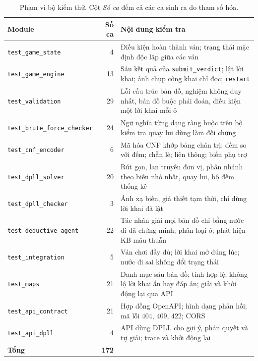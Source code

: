 \begin{table}[htbp]
  \centering\small
  \caption{Phạm vi bộ kiểm thử. Cột \emph{Số ca} đếm cả các ca sinh ra do tham
    số hóa.}
  \label{tab:test_results}
  \begin{tabularx}{\textwidth}{lr>{\raggedright\arraybackslash}X}
    \toprule
    \textbf{Module} & \textbf{Số ca} & \textbf{Nội dung kiểm tra} \\
    \midrule
    \texttt{test\_game\_state}         &  4 & Điều kiện hoàn thành ván; trạng thái mặc định độc lập giữa các ván \\
    \texttt{test\_game\_engine}        & 13 & Sáu kết quả của \texttt{submit\_verdict}; lật lời khai; ảnh chụp công khai chỉ đọc; \texttt{restart} \\
    \texttt{test\_validation}          & 29 & Lỗi cấu trúc bản đồ, nghiệm không duy nhất, bản đồ buộc phải đoán, điều kiện một lời khai mỗi ô \\
    \texttt{test\_brute\_force\_checker} & 24 & Ngữ nghĩa từng dạng ràng buộc trên bộ kiểm tra quay lui dùng làm đối chứng \\
    \texttt{test\_cnf\_encoder}        &  6 & Mã hóa CNF khớp bảng chân trị; đếm so với đếm; chẵn lẻ; liên thông; biến phụ trợ \\
    \texttt{test\_dpll\_solver}        & 20 & Rút gọn, lan truyền đơn vị, phân nhánh theo biến nhỏ nhất, quay lui, bộ đếm thống kê \\
    \texttt{test\_dpll\_checker}       &  3 & Ánh xạ biến, giả thiết tạm thời, chỉ dùng lời khai đã lật \\
    \texttt{test\_deductive\_agent}    & 22 & Tác nhân giải mọi bản đồ chỉ bằng nước đi đã chứng minh; phân loại ô; phát hiện KB mâu thuẫn \\
    \texttt{test\_integration}         &  5 & Ván chơi đầy đủ; lời khai mở đúng lúc; nước đi sai không đổi trạng thái \\
    \texttt{test\_maps}                & 21 & Danh mục sáu bản đồ; tính hợp lệ; không lộ lời khai ẩn hay đáp án; giải và khởi động lại qua API \\
    \texttt{test\_api\_contract}       & 21 & Hợp đồng OpenAPI; hình dạng phản hồi; mã lỗi 404, 409, 422; CORS \\
    \texttt{test\_api\_dpll}           &  4 & API dùng DPLL cho gợi ý, phán quyết và tự giải; trace và khởi động lại \\
    \midrule
    \textbf{Tổng}                      & \textbf{172} & \\
    \bottomrule
  \end{tabularx}
\end{table}
